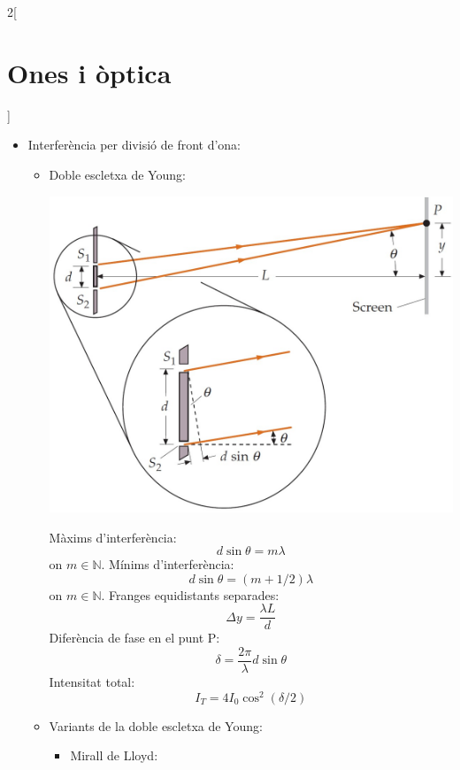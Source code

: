 \documentclass[../../../main.tex]{subfiles}
\begin{document}
\begin{multicols}{2}[\section{Ones i òptica}]
\begin{itemize}
\begin{itemize}
\begin{itemize}
\begin{minipage}{\linewidth}
            \end{minipage}
        \end{itemize}
    \end{itemize}
    \item Interferència per divisió de front d'ona:
    \begin{itemize}
        \item Doble escletxa de Young:\newline
        \begin{minipage}{\linewidth}
            \includegraphics[width=\linewidth]{Physics/1st/Waves_and_optics/Images/young.jpg} 
        \end{minipage}
Màxims d'interferència: $$d\sin\theta=m\lambda$${\footnotesize on $m\in\mathbb{N}$.}\newline 
Mínims d'interferència: $$d\sin\theta=(m+1/2)\lambda$$ {\footnotesize on $m\in\mathbb{N}$.}\newline 
Franges equidistants separades: $$\Delta y=\frac{\lambda L}{d}$$
Diferència de fase en el punt P:
        $$\delta=\frac{2\pi}{\lambda}d\sin\theta$$
        Intensitat total: $$I_T=4I_0\cos^2(\delta/2)$$
        \item Variants de la doble escletxa de Young:
    \begin{itemize}
        \item Mirall de Lloyd:\newline
        \begin{minipage}{\linewidth}

\end{minipage}
\end{itemize}
\end{itemize}
\end{itemize}
\end{multicols}
\end{document}
